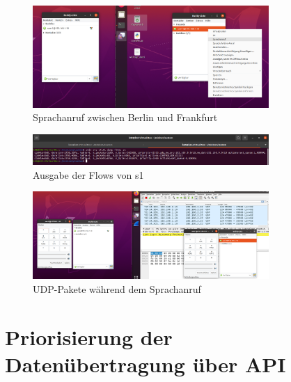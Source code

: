 \documentclass[fontsize=12pt,paper=a4,open=any,parskip=half,
  twoside=false,toc=listof,toc=bibliography,fleqn,leqno,
  captions=nooneline,captions=tableabove,british]{scrbook}
\begin{document}
\begin{figure}[H]
 \centering
 \includegraphics[width=0.8\textwidth]{Bilder/pidgin}
 \captionsetup{justification=centering}
 \caption{Sprachanruf zwischen Berlin und Frankfurt}
 \label{pidgin}
\end{figure}

\begin{figure}[H]
 \centering
 \includegraphics[width=0.8\textwidth]{Bilder/udp}
 \captionsetup{justification=centering}
 \caption{Ausgabe der Flows von s1}
 \label{udp}
\end{figure}

\begin{figure}[H]
 \centering
 \includegraphics[width=0.8\textwidth]{Bilder/udp2}
 \captionsetup{justification=centering}
 \caption{UDP-Pakete während dem Sprachanruf}
 \label{udp2}
\end{figure}

\newpage
\section{Priorisierung der Datenübertragung über API}
\end{document}
